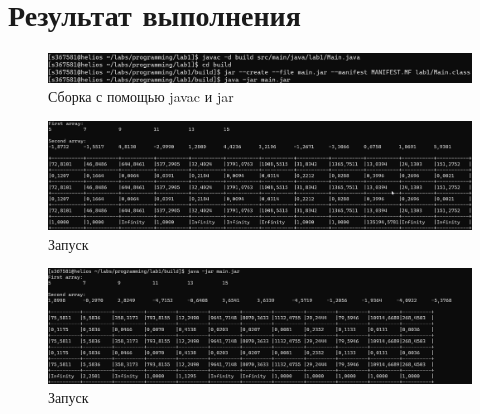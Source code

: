 \section{Результат выполнения}
\begin{figure}[ht]
    \centering
    \includegraphics[scale=0.5]{img/build_cli.png}
    \caption{Сборка с помощью javac и jar}
\end{figure}
\begin{figure}[ht]
    \centering
    \includegraphics[scale=0.4]{img/first.png}
    \caption{Запуск }
\end{figure}
\begin{figure}[htb!]
    \centering
    \includegraphics[scale=0.4]{img/second.png}
    \caption{Запуск }
\end{figure}